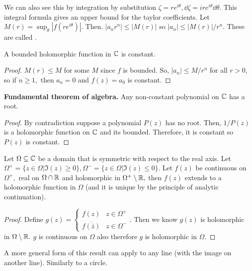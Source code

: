 \documentclass[a4paper,12pt]{article}
\begin{document}
We can also see this by integration by substitution $\zeta=re^{i\theta},\dd\zeta=ire^{i\theta}\dd\theta.$ This integral formula gives an upper bound for the taylor coefficients. Let $M(r)=\sup_\theta|f(re^{i\theta})|.$ Then. $|a_nr^n|\leq|M(r)|$ so $|a_n|\leq|M(r)|/r^n.$ These are called .
\begin{theorem}[Liouville]
    A bounded holomorphic function in $\mathbb{C}$ is constant.
    \begin{proof}
        $M(r)\leq M$ for some $M$ since $f$ is bounded. So, $|a_n|\leq M/r^n$ for all $r>0,$ so if $n\geq1,$ then $a_n=0$ and $f(z)=a_0$ is constant. 
    \end{proof}
\end{theorem}
\begin{corollary}
    \textbf{Fundamental theorem of algebra.} Any non-constant polynomial on $\mathbb{C}$ has a root.
    \begin{proof}
        By contradiction suppose a polynomial $P(z)$ has no root. Then, $1/P(z)$ is a holomorphic function on $\mathbb{C}$ and its bounded. Therefore, it is constant so $P(z)$ is constant. 
    \end{proof}
\end{corollary}
\begin{theorem}
    Let $\Omega\subseteq\mathbb{C}$ be a domain that is symmetric with respect to the real axis. Let $\Omega^+=\{z\in\Omega|\Im(z)\geq0\},\Omega^-=\{z\in\Omega|\Im(z)\leq0\}.$ Let $f(z)$ be continuous on $\Omega^+,$ real on $\Omega\cap\mathbb{R}$ and holomorphic in $\Omega^{+}\setminus\mathbb{R},$ then $f(z)$ extends to a holomorphic function in $\Omega$ (and it is unique by the principle of analytic continuation).
    \begin{proof}
        Define $g(z)=\begin{cases}
            f(z)& z\in\Omega^+\\
            \overline{f(\bar z)} & z\in\Omega^-
        \end{cases}.$ Then we know $g(z)$ is holomorphic in $\Omega\setminus\mathbb{R}.$ $g$ is continuous on $\Omega$ also therefore $g$ is holomorphic in $\Omega.$
    \end{proof}
    A more general form of this result can apply to any line (with the image on another line). Similarly to a circle.
\end{theorem}
\end{document}
